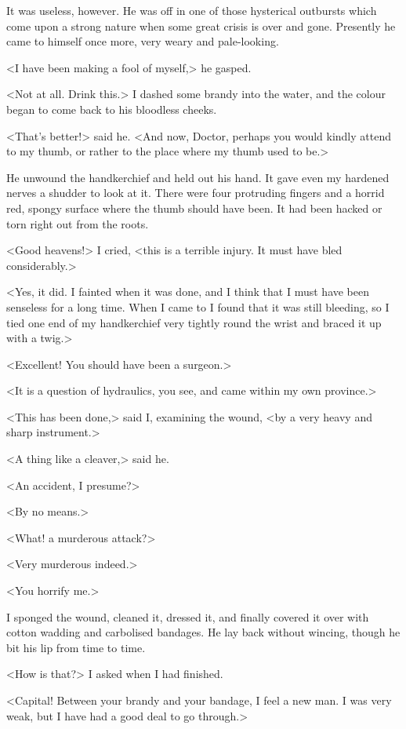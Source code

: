 It was useless, however. He was off in one of those hysterical outbursts which come upon a strong nature when some great crisis is over and gone. Presently he came to himself once more, very weary and pale-looking.

<I have been making a fool of myself,> he gasped.

<Not at all. Drink this.> I dashed some brandy into the water, and the colour began to come back to his bloodless cheeks.

<That's better!> said he. <And now, Doctor, perhaps you would kindly attend to my thumb, or rather to the place where my thumb used to be.>

He unwound the handkerchief and held out his hand. It gave even my hardened nerves a shudder to look at it. There were four protruding fingers and a horrid red, spongy surface where the thumb should have been. It had been hacked or torn right out from the roots.

<Good heavens!> I cried, <this is a terrible injury. It must have bled considerably.>

<Yes, it did. I fainted when it was done, and I think that I must have been senseless for a long time. When I came to I found that it was still bleeding, so I tied one end of my handkerchief very tightly round the wrist and braced it up with a twig.>

<Excellent! You should have been a surgeon.>

<It is a question of hydraulics, you see, and came within my own province.>

<This has been done,> said I, examining the wound, <by a very heavy and sharp instrument.>

<A thing like a cleaver,> said he.

<An accident, I presume?>

<By no means.>

<What! a murderous attack?>

<Very murderous indeed.>

<You horrify me.>

I sponged the wound, cleaned it, dressed it, and finally covered it over with cotton wadding and carbolised bandages. He lay back without wincing, though he bit his lip from time to time.

<How is that?> I asked when I had finished.

<Capital! Between your brandy and your bandage, I feel a new man. I was very weak, but I have had a good deal to go through.>

